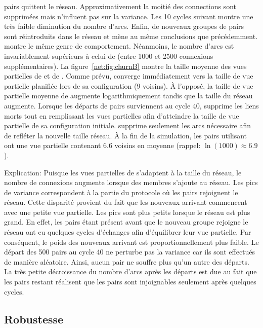 \begin{asparadesc}
  pairs quittent le réseau. Approximativement la moitié des connections sont
  supprimées mais n'influent pas sur la variance. Les 10 cycles suivant montre
  une très faible diminution du nombre d'arcs. Enfin, de nouveaux groupes de
  pairs sont réintroduits dans le réseau et mène au même conclusions que
  précédemment. \CYCLON montre le même genre de comportement. Néanmoins, le
  nombre d'arcs est invariablement supérieurs à celui de \SPRAY (entre 1000 et
  2500 connexions supplémentaires). La figure~\ref{net:fig:churnB} montre la
  taille moyenne des vues partielles de \SPRAY et de \CYCLON. Comme prévu,
  \CYCLON converge immédiatement vers la taille de vue partielle planifiée lors
  de sa configuration (9 voisins). À l'opposé, la taille de vue partielle
  moyenne de \SPRAY augmente logarithmiquement tandis que la taille du réseau
  augmente. Lorsque les départs de pairs surviennent au cycle 40, \CYCLON
  supprime les liens morts tout en remplissant les vues partielles afin
  d'atteindre la taille de vue partielle de sa configuration initiale. \SPRAY
  supprime seulement les arcs nécessaire afin de refléter la nouvelle taille
  réseau. À la fin de la simulation, les pairs utilisant \SPRAY ont une vue
  partielle contenant 6.6 voisins en moyenne (rappel: $\ln(1000)\approx 6.9$).
\item [Explication:] Puisque les vues partielles de \SPRAY s'adaptent à la
  taille du réseau, le nombre de connexions augmente lorsque des membres
  s'ajoute au réseau. Les pics de variance correspondent à la partie du
  protocole où les pairs rejoignent le réseau. Cette disparité provient du fait
  que les nouveaux arrivant commencent avec une petite vue partielle. Les pics
  sont plus petits lorsque le réseau est plus grand. En effet, les pairs étant
  présent avant que le nouveau groupe rejoigne le réseau ont eu quelques cycles
  d'échanges afin d'équilibrer leur vue partielle. Par conséquent, le poids des
  nouveaux arrivant est proportionnellement plus faible. Le départ des 500 pairs
  au cycle 40 ne perturbe pas la variance car ils sont effectués de manière
  aléatoire. Ainsi, aucun pair ne souffre plus qu'un autre des départs. La très
  petite décroissance du nombre d'arcs après les départs est due au fait que les
  pairs restant réalisent que les pairs sont injoignables seulement après
  quelques cycles. 
\end{asparadesc}

\subsection{Robustesse}

